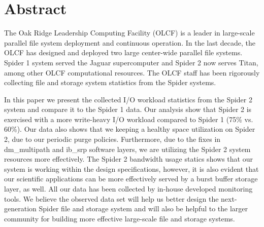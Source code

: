 \section*{Abstract}
\label{sec:abstract}

The Oak Ridge Leadership Computing Facility (OLCF) is a leader in large-scale
parallel file system deployment and continuous operation. In the last decade,
the OLCF has designed and deployed two large center-wide parallel file systems.
Spider 1 system served the Jaguar supercomputer and Spider 2 now serves Titan,
among other OLCF computational resources. The OLCF staff has been rigorously
collecting file and storage system statistics from the Spider systems. 

In this paper we present the collected I/O workload statistics from the Spider
2 system and compare it to the Spider 1 data. Our analysis show that Spider 2
is exercised with a more write-heavy I/O workload compared to Spider 1 (75\%
vs. 60\%). Our data also shows that we keeping a healthy space utilization on
Spider 2, due to our periodic purge policies. Furthermore, due to the fixes in
dm\_multipath and ib\_srp software layers, we are utilizing the Spider 2 system
resources more effectively. The Spider 2 bandwidth usage statics shows that our
system is working within the design specifications, however, it is also evident
that our scientific applications can be more effectively served by a burst
buffer storage layer, as well. All our data has been collected by in-house
developed monitoring tools. We believe the observed data set will help us
better design the next-generation Spider file and storage system and will also
be helpful to the larger community for building more effective large-scale file
and storage systems. 

 
